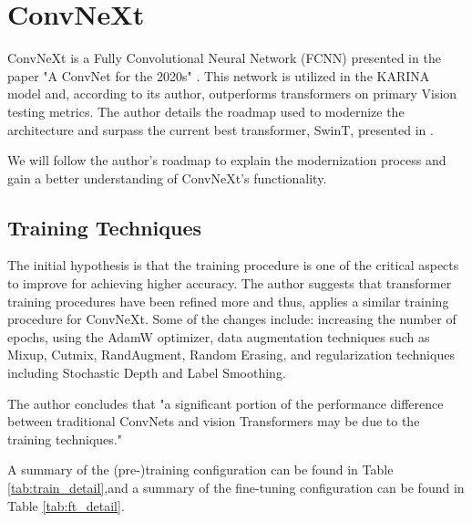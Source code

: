 \section{ConvNeXt}
ConvNeXt is a Fully Convolutional Neural Network (FCNN) presented in the paper "A ConvNet for the 2020s" \cite{liu2022convnet}. This network is utilized in the KARINA model and, according to its author, outperforms transformers on primary Vision testing metrics. The author details the roadmap used to modernize the architecture and surpass the current best transformer, SwinT, presented in \cite{liu2021swin}.

We will follow the author's roadmap to explain the modernization process and gain a better understanding of ConvNeXt's functionality.

\subsection*{Training Techniques}
The initial hypothesis is that the training procedure is one of the critical aspects to improve for achieving higher accuracy. The author suggests that transformer training procedures have been refined more and thus, applies a similar training procedure for ConvNeXt. Some of the changes include: increasing the number of epochs, using the AdamW optimizer, data augmentation techniques such as Mixup, Cutmix, RandAugment, Random Erasing, and regularization techniques including Stochastic Depth and Label Smoothing.

The author concludes that "a significant portion of the performance difference between traditional ConvNets and vision Transformers may be due to the training techniques."

A summary of the (pre-)training configuration can be found in Table \ref{tab:train_detail},and a summary of the fine-tuning configuration can be found in Table \ref{tab:ft_detail}.\\


